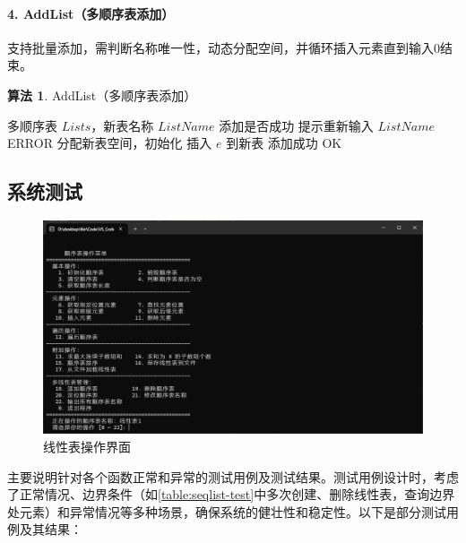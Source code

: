 \documentclass[supercite]{Experimental_Report}
\theoremstyle{definition}
\newtheorem{alg}{算法}[section]
\begin{document}
\paragraph{4. AddList（多顺序表添加）}
支持批量添加，需判断名称唯一性，动态分配空间，并循环插入元素直到输入0结束。

\begin{shaded*}
\begin{alg}{AddList（多顺序表添加）}
    \label{alg:AddList}
    \begin{algorithmic}
        \Input 多顺序表 $Lists$，新表名称 $ListName$
        \Output 添加是否成功
                \State 提示重新输入 $ListName$
            \EndWhile
                \State \Return ERROR
            \EndIf
            \State 分配新表空间，初始化
                \State 插入 $e$ 到新表
            \EndWhile
            \State 添加成功
        \EndFor
        \State \Return OK
    \end{algorithmic}
\end{alg}
\end{shaded*}

\subsection{系统测试}

\begin{figure}[htb]
	\begin{center}
		\includegraphics[scale=0.30]{images/1-1.jpg}
		\caption{线性表操作界面}
		\label{fig1-1}
	\end{center}
\end{figure}

主要说明针对各个函数正常和异常的测试用例及测试结果。测试用例设计时，考虑了正常情况、边界条件（如\ref{table:seqlist-test}中多次创建、删除线性表，查询边界处元素）和异常情况等多种场景，确保系统的健壮性和稳定性。以下是部分测试用例及其结果：
\end{document}
